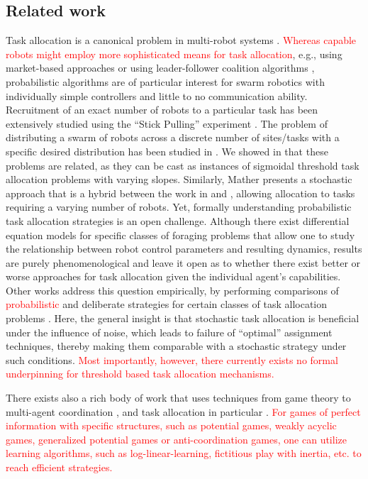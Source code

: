 \documentclass[smallextended]{svjour3}       %
\newcommand{\edit}[1]{\textcolor{red}{#1}}
\begin{document}
\subsection{Related work}
Task allocation is a canonical problem in multi-robot systems \citep{Gerkey2004}. \edit{Whereas capable robots might employ more sophisticated means for task allocation}, e.g., using market-based approaches \citep{Amstutz2008,Vig2007,choi2009consensus} or using  leader-follower coalition algorithms \citep{Chen2011}, probabilistic algorithms are of particular interest for swarm robotics with individually simple controllers \citep{Dantu2012} and little to no communication ability. Recruitment of an exact number of robots to a particular task has been extensively studied using the ``Stick Pulling'' experiment \citep{Lerman2001,Martinoli2004}. The problem of distributing a swarm of robots across a discrete number of sites/tasks with a specific desired distribution has been studied in \citep{Berman2009,Correll2008}. We showed in \citep{Kanakia2014} that these problems are related, as they can be cast as instances of sigmoidal threshold task allocation problems with varying slopes. Similarly, Mather \citep{Mather2010} presents a stochastic approach that is a hybrid between the work in \citep{Berman2009} and \citep{Martinoli2004}, allowing allocation to tasks requiring a varying number of robots. Yet, formally understanding probabilistic task allocation strategies is an open challenge. Although there exist differential equation models for specific classes of foraging problems \citep{lerman2006analysis,liu2010modelling} that allow one to study the relationship between robot control parameters and resulting dynamics, results are purely phenomenological and leave it open as to whether there exist better or worse approaches for task allocation given the individual agent's capabilities. Other works address this question empirically, by performing comparisons of \edit{probabilistic} and deliberate strategies for certain classes of task allocation problems \citep{Kalra2006,correll2007coordination}. Here, the general insight is that stochastic task allocation is beneficial under the influence of noise, which leads to failure of ``optimal'' assignment techniques, thereby making them comparable with a stochastic strategy under such conditions. \edit{Most importantly, however, there currently exists no formal underpinning for threshold based task allocation mechanisms.}

There exists also a rich body of work that uses techniques from game theory to multi-agent coordination \citep{parsons2002game,nisan2007algorithmic}, and task allocation in particular \citep{shehory1998methods}. \edit{For games of perfect information with specific structures, such as potential games, weakly acyclic games, generalized potential games or anti-coordination games, one can utilize learning algorithms, such as log-linear-learning, fictitious play with inertia, etc. to reach efficient strategies\cite{tumer2004survey,arslan2007autonomous,marden2009joint,grenager2002dispersion}.}  
\end{document}
